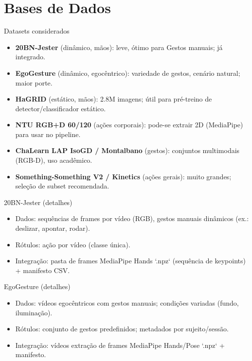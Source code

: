 \documentclass[aspectratio=169]{beamer}
\begin{document}
\section{Bases de Dados}
\begin{frame}{Datasets considerados}
  \begin{itemize}
    \item \textbf{20BN-Jester} (dinâmico, mãos): leve, ótimo para Gestos manuais; já integrado.
    \item \textbf{EgoGesture} (dinâmico, egocêntrico): variedade de gestos, cenário natural; maior porte.
    \item \textbf{HaGRID} (estático, mãos): 2.8M imagens; útil para pré-treino de detector/classificador estático.
    \item \textbf{NTU RGB+D 60/120} (ações corporais): pode-se extrair 2D (MediaPipe) para usar no pipeline.
    \item \textbf{ChaLearn LAP IsoGD / Montalbano} (gestos): conjuntos multimodais (RGB-D), uso acadêmico.
    \item \textbf{Something-Something V2 / Kinetics} (ações gerais): muito grandes; seleção de subset recomendada.
  \end{itemize}
\end{frame}

\begin{frame}{20BN-Jester (detalhes)}
  \begin{itemize}
    \item Dados: sequências de frames por vídeo (RGB), gestos manuais dinâmicos (ex.: deslizar, apontar, rodar).
    \item Rótulos: ação por vídeo (classe única).
    \item Integração: pasta de frames \Rightarrow MediaPipe Hands \Rightarrow `.npz` (sequência de keypoints) + manifesto CSV.
  \end{itemize}
\end{frame}

\begin{frame}{EgoGesture (detalhes)}
  \begin{itemize}
    \item Dados: vídeos egocêntricos com gestos manuais; condições variadas (fundo, iluminação).
    \item Rótulos: conjunto de gestos predefinidos; metadados por sujeito/sessão.
    \item Integração: vídeos \Rightarrow extração de frames \Rightarrow MediaPipe Hands/Pose \Rightarrow `.npz` + manifesto.
  \end{itemize}
\end{frame}
\end{document}

